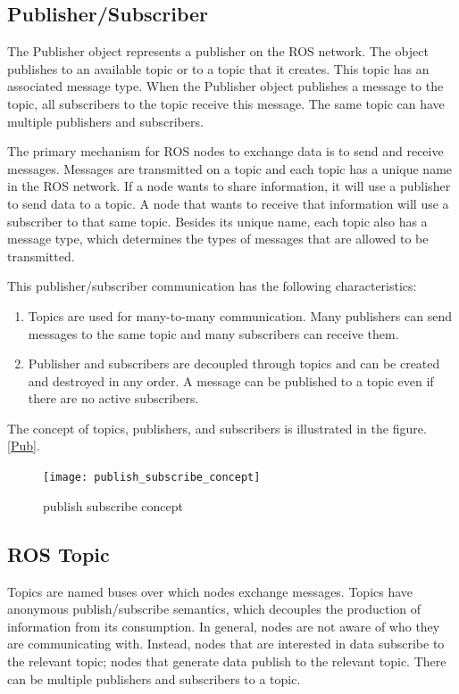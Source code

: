 \subsection{Publisher/Subscriber}
	The Publisher object represents a publisher on the ROS network. The object publishes to an available topic or to a topic that it creates. This topic has an associated message type. When the Publisher object publishes a message to the topic, all subscribers to the topic receive this message. The same topic can have multiple publishers and subscribers.
	
	The primary mechanism for ROS nodes to exchange data is to send and receive messages. Messages are transmitted on a topic and each topic has a unique name in the ROS network. If a node wants to share information, it will use a publisher to send data to a topic. A node that wants to receive that information will use a subscriber to that same topic. Besides its unique name, each topic also has a message type, which determines the types of messages that are allowed to be transmitted.
	
	This publisher/subscriber communication has the following characteristics:
	\begin{enumerate}
		\item Topics are used for many-to-many communication. Many publishers can send messages to the same topic and many subscribers can receive them.
		\item Publisher and subscribers are decoupled through topics and can be created and destroyed in any order. A message can be published to a topic even if there are no active subscribers.
	\end{enumerate}
	
	The concept of topics, publishers, and subscribers is illustrated in the figure.\ref{Pub}.
	\begin{figure}[h]		
		\centering
		\texttt{[image: publish\_subscribe\_concept]}
		\caption{publish subscribe concept}
		\label{Fig:Pub}
	\end{figure}


\subsection{ROS Topic}

	Topics are named buses over which nodes exchange messages. Topics have anonymous publish/subscribe semantics, which decouples the production of information from its consumption. In general, nodes are not aware of who they are communicating with. Instead, nodes that are interested in data subscribe to the relevant topic; nodes that generate data publish to the relevant topic. There can be multiple publishers and subscribers to a topic.
	

